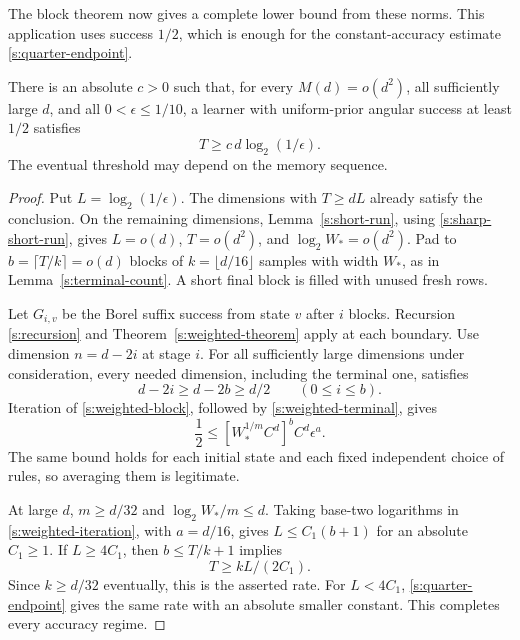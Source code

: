 The block theorem now gives a complete lower bound from these norms.
This application uses success \(1/2\), which is enough for the
constant-accuracy estimate \eqref{s:quarter-endpoint}.

\begin{corollary}\label{s:weighted-application}
There is an absolute \(c>0\) such that, for every \(M(d)=o(d^2)\),
all sufficiently large \(d\), and all \(0<\epsilon\le1/10\), a learner
with uniform-prior angular success at least \(1/2\) satisfies
\[
 T\ge c\,d\log_2(1/\epsilon).
\]
The eventual threshold may depend on the memory sequence.
\end{corollary}
\begin{proof}
Put \(L=\log_2(1/\epsilon)\). The dimensions with \(T\ge dL\)
already satisfy the conclusion. On the remaining dimensions,
Lemma~\ref{s:short-run}, using
\eqref{s:sharp-short-run}, gives \(L=o(d)\), \(T=o(d^2)\), and
\(\log_2 W_*=o(d^2)\). Pad to \(b=\lceil T/k\rceil=o(d)\) blocks
of \(k=\lfloor d/16\rfloor\) samples with width \(W_*\), as in
Lemma~\ref{s:terminal-count}. A short final block is filled with
unused fresh rows.

Let \(G_{i,v}\) be the Borel suffix success from state \(v\) after
\(i\) blocks. Recursion \eqref{s:recursion} and
Theorem~\ref{s:weighted-theorem} apply at each boundary. Use dimension
\(n=d-2i\) at stage \(i\). For all sufficiently large dimensions
under consideration, every needed dimension, including the terminal
one, satisfies
\begin{equation}\label{s:weighted-budget}
 d-2i\ge d-2b\ge d/2\qquad(0\le i\le b).
\end{equation}
Iteration of \eqref{s:weighted-block}, followed by
\eqref{s:weighted-terminal}, gives
\begin{equation}\label{s:weighted-iteration}
 \frac12\le
       [W_*^{1/m}C^d]^b C^d\epsilon^a.
\end{equation}
The same bound holds for each initial state and each fixed independent
choice of rules, so averaging them is legitimate.

At large \(d\), \(m\ge d/32\) and
\(\log_2 W_*/m\le d\). Taking base-two logarithms in
\eqref{s:weighted-iteration}, with \(a=d/16\), gives
\(L\le C_1(b+1)\) for an absolute \(C_1\ge1\).
If \(L\ge4C_1\), then \(b\le T/k+1\) implies
\[
 T\ge kL/(2C_1).
\]
Since \(k\ge d/32\) eventually, this is the asserted rate. For
\(L<4C_1\), \eqref{s:quarter-endpoint} gives the same rate with
an absolute smaller constant. This completes every accuracy regime.
\end{proof}
